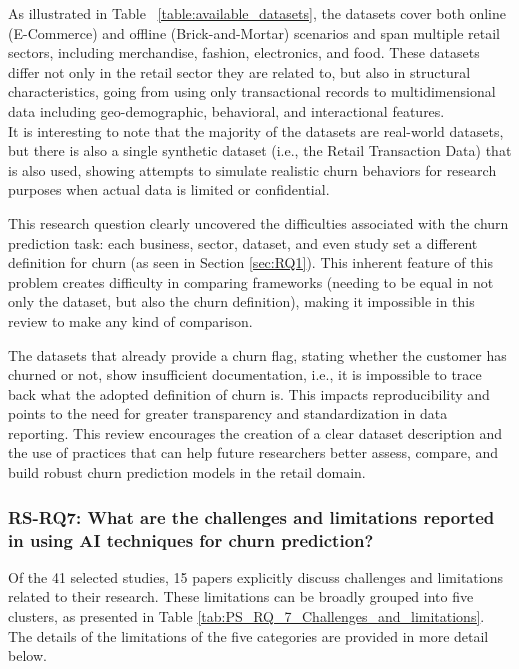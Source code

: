 \documentclass[preprint,12pt]{elsarticle}
\newcommand{\DD}[2]{\textcolor{blue}{#1}[\textcolor{red}{#2}]}
\newcommand{\RSRQseven}{RS-RQ7: What are the challenges and limitations reported in using AI techniques for churn prediction?}
\begin{document}
As illustrated in Table ~\ref{table:available_datasets}, the datasets cover both online (E-Commerce) and offline (Brick-and-Mortar) scenarios and span multiple retail sectors, including merchandise, fashion, electronics, and food. These datasets differ not only in the retail sector they are related to, but also in structural characteristics, going from using only transactional records to multidimensional data including geo-demographic, behavioral, and interactional features. \\
It is interesting to note that the majority of the datasets are real-world datasets, but there is also a single synthetic dataset (i.e., the Retail Transaction Data) that is also used, showing attempts to simulate realistic churn behaviors for research purposes when actual data is limited or confidential. 

This research question clearly uncovered the difficulties associated with the churn prediction task: each business, sector, dataset, and even study set a different definition for churn (as seen in Section \ref{sec:RQ1}). This inherent feature of this problem creates difficulty in comparing frameworks (needing to be equal in not only the dataset, but also the churn definition), making it impossible in this review to make any kind of comparison.

The datasets that already provide a churn flag, stating whether the customer has churned or not, show insufficient documentation, i.e., it is impossible to trace back what the adopted definition of churn is. This impacts reproducibility and points to the need for greater transparency and standardization in data reporting. 
This review encourages the creation of a clear dataset description and the use of practices that can help future researchers better assess, compare, and build robust churn prediction models in the retail domain.


\newpage
\subsubsection{\RSRQseven}



Of the 41 selected studies, 15 papers explicitly discuss challenges and limitations related to their research. These limitations can be broadly grouped into five clusters, as presented in Table \ref{tab:PS_RQ_7_Challenges_and_limitations}. The details of the limitations of the five categories are provided in more detail below.
\end{document}
